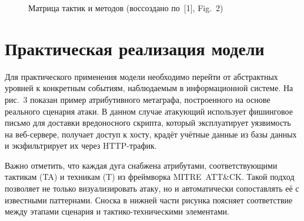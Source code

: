 \documentclass[12pt,a4paper]{extarticle}
\begin{document}
\begin{figure}[ht]
\centering
{}
\caption{Матрица тактик и методов (воссоздано по~[1], Fig.~2)}
\label{fig:tactics-methods}
\end{figure}

\section{Практическая реализация модели}

Для практического применения модели необходимо перейти от абстрактных уровней к конкретным событиям, наблюдаемым в информационной системе. На рис.~3 показан пример атрибутивного метаграфа, построенного на основе реального сценария атаки. В данном случае атакующий использует фишинговое письмо для доставки вредоносного скрипта, который эксплуатирует уязвимость на веб-сервере, получает доступ к хосту, крадёт учётные данные из базы данных и экзфильтрирует их через HTTP-трафик.

Важно отметить, что каждая дуга снабжена атрибутами, соответствующими тактикам (TA) и техникам (T) из фреймворка MITRE~ATT\&CK. Такой подход позволяет не только визуализировать атаку, но и автоматически сопоставлять её с известными паттернами. Сноска в нижней части рисунка поясняет соответствие между этапами сценария и тактико-техническими элементами.
\end{document}
